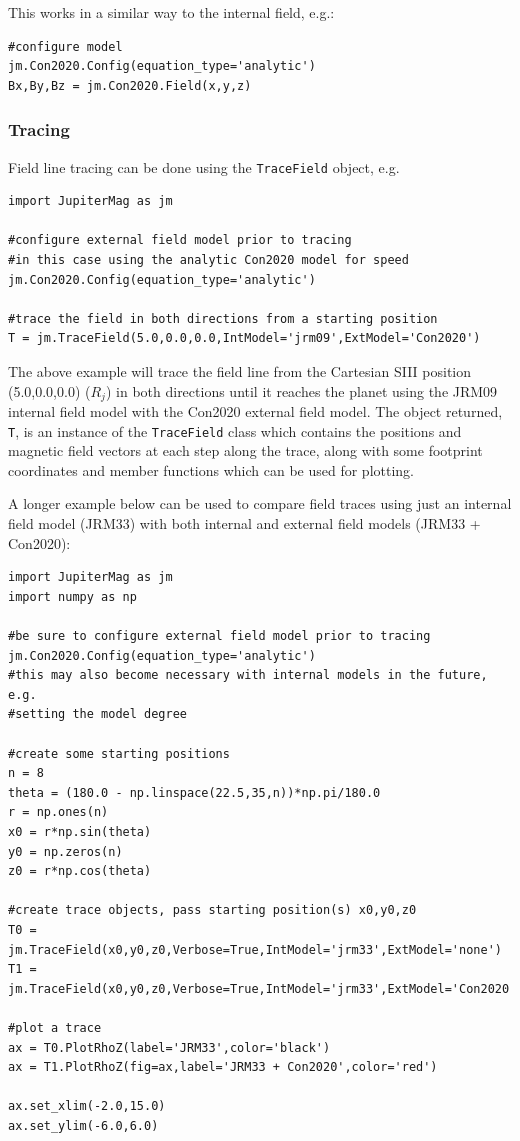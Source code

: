 		This works in a similar way to the internal field, e.g.:
		
		\begin{verbatim}
#configure model
jm.Con2020.Config(equation_type='analytic')
Bx,By,Bz = jm.Con2020.Field(x,y,z)
		\end{verbatim}
	
	\subsubsection{Tracing}
	
		Field line tracing can be done using the \texttt{TraceField} object, e.g.
	
		\begin{verbatim}
import JupiterMag as jm
	
#configure external field model prior to tracing
#in this case using the analytic Con2020 model for speed
jm.Con2020.Config(equation_type='analytic')
	
#trace the field in both directions from a starting position
T = jm.TraceField(5.0,0.0,0.0,IntModel='jrm09',ExtModel='Con2020')
		\end{verbatim}
	
		The above example will trace the field line from the Cartesian SIII position (5.0,0.0,0.0) ($R_j$) in both directions until it reaches the planet using the JRM09 internal field model with the Con2020 external field model. The object returned, \texttt{T}, is an instance of the \texttt{TraceField} class which contains the positions and magnetic field vectors at each step along the trace, along with some footprint coordinates and member functions which can be used for plotting.
	
		A longer example below can be used to compare field traces using just an internal field model (JRM33) with both internal and external field models (JRM33  + Con2020):
	
		\begin{verbatim}
import JupiterMag as jm
import numpy as np
	
#be sure to configure external field model prior to tracing
jm.Con2020.Config(equation_type='analytic')
#this may also become necessary with internal models in the future, e.g.
#setting the model degree
	
#create some starting positions
n = 8
theta = (180.0 - np.linspace(22.5,35,n))*np.pi/180.0
r = np.ones(n)
x0 = r*np.sin(theta)
y0 = np.zeros(n)
z0 = r*np.cos(theta)
	
#create trace objects, pass starting position(s) x0,y0,z0
T0 = jm.TraceField(x0,y0,z0,Verbose=True,IntModel='jrm33',ExtModel='none')
T1 = jm.TraceField(x0,y0,z0,Verbose=True,IntModel='jrm33',ExtModel='Con2020')
	
#plot a trace
ax = T0.PlotRhoZ(label='JRM33',color='black')
ax = T1.PlotRhoZ(fig=ax,label='JRM33 + Con2020',color='red')
	
ax.set_xlim(-2.0,15.0)
ax.set_ylim(-6.0,6.0)
		\end{verbatim}
		
